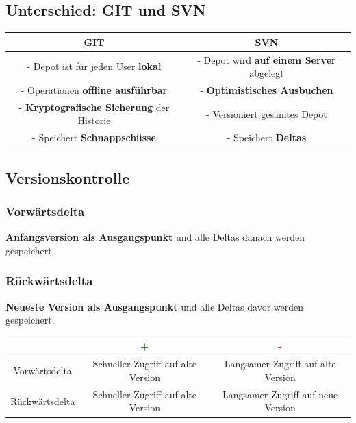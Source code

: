 \documentclass[parskip=full, 12pt]{scrartcl}
\begin{document}
		\subsection{Unterschied: GIT und SVN}
	
			\begin{center}
				\begin{tabular}{c|c}
					\textbf{GIT} & \textbf{SVN} \\
					\hline
					- Depot ist für jeden User \textbf{lokal} & - Depot wird \textbf{auf einem Server} abgelegt \\
					- Operationen \textbf{offline ausführbar} & - \textbf{Optimistisches Ausbuchen} \\
					- \textbf{Kryptografische Sicherung} der Historie & - Versioniert gesamtes Depot \\
					- Speichert \textbf{Schnappschüsse} & - Speichert \textbf{Deltas} \\
				\end{tabular}
			\end{center}
	
		\subsection{Versionskontrolle}
	
			\subsubsection{Vorwärtsdelta}
	
				\textbf{Anfangsversion als Ausgangspunkt} und alle Deltas danach werden gespeichert.
	
			\subsubsection{Rückwärtsdelta}
	
				\textbf{Neueste Version als Ausgangspunkt} und alle Deltas davor werden gespeichert.
	
			\begin{tabular}{c|c|c}
				& \textcolor{green}{\textbf{+}} & \textcolor{red}{\textbf{-}} \\
				\hline
				Vorwärtsdelta & Schneller Zugriff auf alte Version & Langsamer Zugriff auf alte Version \\
				\hline
				Rückwärtsdelta & Schneller Zugriff auf alte Version & Langsamer Zugriff auf neue Version \\
			\end{tabular}
	
\end{document}
